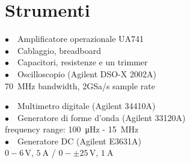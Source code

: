 
\section{Strumenti}
%
\noindent
\begin{minipage}{.5\linewidth}
$\bullet \quad$Amplificatore operazionale UA741\\
$\bullet \quad$Cablaggio, breadboard\\
$\bullet \quad$Capacitori, resistenze e un trimmer\\
$\bullet \quad$Oscilloscopio (Agilent DSO-X 2002A)\\
\phantom{xxxx}\SI{70}{\mega\hertz} bandwidth, 2GSa/s sample rate\\
\end{minipage}%
\begin{minipage}{.5\linewidth}
$\bullet \quad$Multimetro digitale (Agilent 34410A)\\
$\bullet \quad$Generatore di forme d'onda (Agilent 33120A)\\
\phantom{xxxx}frequency range: \SI{100}{\micro\hertz} - \SI{15}{\mega\hertz}\\
$\bullet \quad$Generatore DC (Agilent E3631A)\\
\phantom{xxxx}$0-6\,\si{\volt}$, $\SI{5}{\ampere}$ / $0-\pm25\,\si{\volt}$, $\SI{1}{\ampere}$\\
\end{minipage}